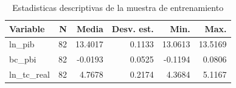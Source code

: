 \begin{table}[H]
\centering
\caption{Estadisticas descriptivas de la muestra de entrenamiento}
\begin{tabular}{lrrrrr}
\toprule
Variable & N & Media & Desv. est. & Min. & Max. \\
\midrule
ln\_pib & 82 & 13.4017 & 0.1133 & 13.0613 & 13.5169 \\
bc\_pbi & 82 & -0.0193 & 0.0525 & -0.1194 & 0.0806 \\
ln\_tc\_real & 82 & 4.7678 & 0.2174 & 4.3684 & 5.1167 \\
\bottomrule
\end{tabular}
\end{table}
